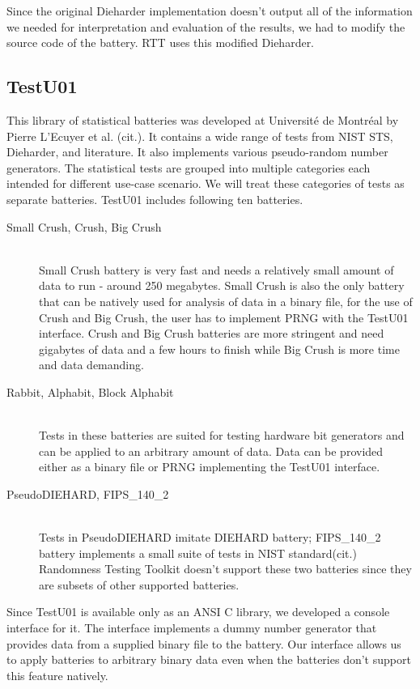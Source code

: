 \documentclass[
  digital,  	%
  color,		%
  oneside,   	%
  12pt,
  nocover,
  notable,
  nolof,
  nolot,
]{fithesis3}
\begin{document}
Since the original Dieharder implementation doesn't output all of the information we needed for interpretation and evaluation of the results, we had to modify the source code of the battery. RTT uses this modified Dieharder.

\subsection{TestU01}
This library of statistical batteries was developed at Université de Montréal by Pierre L’Ecuyer et al. (cit.). It contains a wide range of tests from NIST STS, Dieharder, and literature. It also implements various pseudo-random number generators. The statistical tests are grouped into multiple categories each intended for different use-case scenario. We will treat these categories of tests as separate batteries. TestU01 includes following ten batteries.
\begin{description}
\item[Small Crush, Crush, Big Crush] \hfill \\
Small Crush battery is very fast and needs a relatively small amount of data to run - around 250 megabytes. Small Crush is also the only battery that can be natively used for analysis of data in a binary file, for the use of Crush and Big Crush, the user has to implement PRNG with the TestU01 interface. Crush and Big Crush batteries are more stringent and need gigabytes of data and a few hours to finish while Big Crush is more time and data demanding.
\item[Rabbit, Alphabit, Block Alphabit] \hfill \\
Tests in these batteries are suited for testing hardware bit generators and can be applied to an arbitrary amount of data. Data can be provided either as a binary file or PRNG implementing the TestU01 interface.
\item[PseudoDIEHARD, FIPS\_140\_2] \hfill \\
Tests in PseudoDIEHARD imitate DIEHARD battery; FIPS\_140\_2 battery implements a small suite of tests in NIST standard(cit.) Randomness Testing Toolkit doesn't support these two batteries since they are subsets of other supported batteries.
\end{description}

Since TestU01 is available only as an ANSI C library, we developed a console interface for it. The interface implements a dummy number generator that provides data from a supplied binary file to the battery. Our interface allows us to apply batteries to arbitrary binary data even when the batteries don't support this feature natively.
\end{document}
